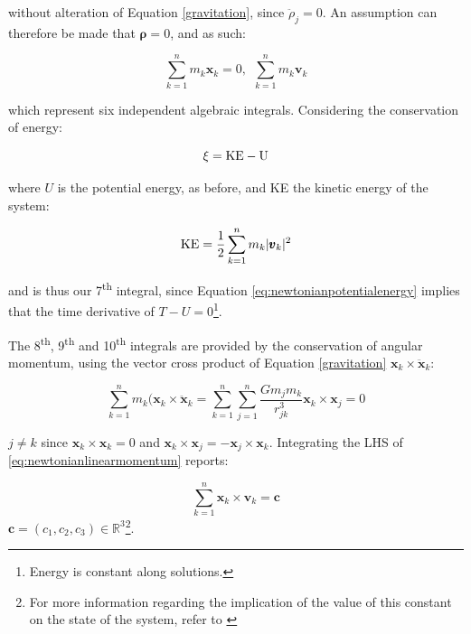 \noindent without alteration of Equation \ref{gravitation}, since $\ddot{\rho}_j = 0$. An assumption can therefore be made that $\pmb{\rho} = 0$, and as such:

\begin{equation}
\sum^n_{k=1} m_k \pmb{x}_k = 0, \hspace{5pt} \sum^n_{k=1} m_k \pmb{v}_k
\end{equation}

\noindent which represent six independent algebraic integrals. Considering the conservation of energy:

\begin{equation}
\xi = \textnormal{KE} - \textnormal{U}
\end{equation}

\noindent where $U$ is the potential energy, as before, and KE the kinetic energy of the system:

\begin{equation}
\textnormal{KE} = \frac{1}{2} \sum^n_{k=1} m_k \lvert \pmb{v}_k \rvert ^2
\end{equation}

\noindent and is thus our 7\textsuperscript{th} integral, since Equation \ref{eq:newtonianpotentialenergy} implies that the time derivative of $T - U = 0$\footnote{Energy is constant along solutions.}.

The 8\textsuperscript{th}, 9\textsuperscript{th} and 10\textsuperscript{th} integrals are provided by the conservation of angular momentum, using the vector cross product of Equation \ref{gravitation} $\pmb{x}_k \times \pmb{\ddot{x}}_k$:

\begin{equation}\label{eq:newtonianangular}
\sum_{k=1}^n m_k (\pmb{x}_k \times \pmb{\ddot{x}}_k = \sum_{k=1}^n \sum_{j=1}^n \frac{G m_j m_k}{r^3_{jk}} \pmb{x}_k \times \pmb{x}_j = 0
\end{equation}

\noindent $j \neq k$ since $\pmb{x}_k \times \pmb{x}_k = 0$ and $\pmb{x}_k \times \pmb{x}_j = -\pmb{x}_j \times \pmb{x}_k$. Integrating the LHS of \ref{eq:newtonianlinearmomentum} reports:

\begin{equation}\label{eq:newtonianangularcons}
\sum_{k=1}^n \pmb{x}_k \times \pmb{v}_k = \pmb{c}
\end{equation}
$\pmb{c} = (c_1, c_2, c_3) \in \mathbb{R}^3$\footnote{For more information regarding the implication of the value of this constant on the state of the system, refer to \citep{Belbruno2004}}.

